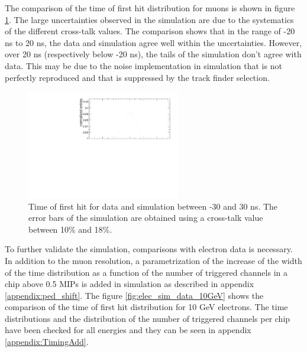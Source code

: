 The comparison of the time of first hit distribution for muons is shown in figure \ref{fig:sim_data_muon}. The large uncertainties observed in the simulation are due to the systematics of the different cross-talk values. The comparison shows that in the range of -20 ns to 20 ns, the data and simulation agree well within the uncertainties. However, over 20 ns (respectively below -20 ns), the tails of the simulation don't agree with data. This may be due to the noise implementation in simulation that is not perfectly reproduced and that is suppressed by the track finder selection.

\begin{figure}[htbp!]
	\centering
	\includegraphics[width=0.6\textwidth]{../Thesis_Plots/Timing/Muons/Plots/Comparison_MokkaDD4hepData_Muons.pdf}
	\caption{Time of first hit for data and simulation between -30 and 30 ns. The error bars of the simulation are obtained using a cross-talk value between 10\% and 18\%.}
	\label{fig:sim_data_muon}
\end{figure}

To further validate the simulation, comparisons with electron data is necessary. In addition to the muon resolution, a parametrization of the increase of the width of the time distribution as a function of the number of triggered channels in a chip above 0.5 MIPs is added in simulation as described in appendix \ref{appendix:ped_shift}. The figure \ref{fig:elec_sim_data_10GeV} shows the comparison of the time of first hit distribution for 10 GeV electrons. The time distributions and the distribution of the number of triggered channels per chip have been checked for all energies and they can be seen in appendix \ref{appendix:TimingAdd}.

